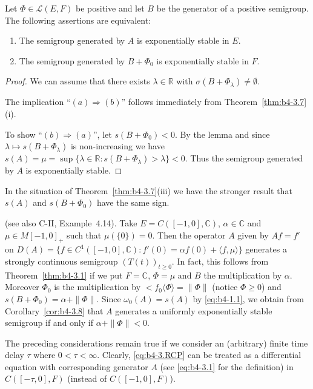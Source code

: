 \begin{corollary}\label{cor:b4-3.8}
Let $\Phi \in \mathcal{L}(E,F)$ be positive and let $B$ be the generator of a positive semigroup. 
The following assertions are equivalent:

\begin{enumerate}[\upshape (a)]
	\item 
    The semigroup generated by $A$ is exponentially stable in $E$.
	
    \item 
    The semigroup generated by $B + \Phi_{0}$ is exponentially stable in $F$.
\end{enumerate}
\end{corollary}
\begin{proof}
We can assume that there exists $\lambda \in \mathbb{R}$ with $\sigma(B+\Phi_{\lambda}) \neq \emptyset$.

The implication \enquote{$(a)\Rightarrow(b)$} follows immediately from Theorem~\ref{thm:b4-3.7}(i).

To show \enquote{$(b)\Rightarrow(a)$}, let $s(B+\Phi_{0}) < 0$. 
By the lemma and since $\lambda \mapsto s(B+\Phi_{\lambda})$ is non-increasing we have $s(A) = \mu = \sup\{\lambda \in \mathbb{R} \colon s(B+\Phi_{\lambda}) > \lambda\} < 0$. 
Thus the semigroup generated by $A$ is exponentially stable.
\end{proof}
\begin{remark*}
In the situation of Theorem~\ref{thm:b4-3.7}(iii) we have the stronger result that $s(A)$ and $s(B + \Phi_{0})$ have the same sign.
\end{remark*}
\begin{example}\label{ex:b4-3.9}
(see also C-II, Example~4.14). Take $E = C([-1,0],\mathbb{C})$, $\alpha \in \mathbb{C}$ and $\mu \in M[-1,0]_{+}$ such that $\mu(\{0\}) = 0$. 
Then the operator $A$ given by $Af = f'$ on $D(A) = \{f \in C^1([-1,0],\mathbb{C}) \colon f'(0) = \alpha f(0) + \langle f,\mu\rangle\}$ generates a strongly continuous semigroup $(T(t))_{t\geq0}$. 
In fact, this follows from Theorem~\ref{thm:b4-3.1} if we put $F = \mathbb{C}$, $\Phi = \mu$ and $B$ the multiplication by $\alpha$. 
Moreover $\Phi_{0}$ is the multiplication by $<f_{0}\langle\Phi\rangle = \|\Phi\|$ (notice $\Phi\geq0$) and $s(B + \Phi_{0}) = \alpha + \|\Phi\|$. 
Since $\omega_{0}(A) = s(A)$ by \eqref{eq:b4-1.1}, we obtain from Corollary~\ref{cor:b4-3.8} that $A$ generates a uniformly exponentially stable semigroup if and only if $\alpha + \|\Phi\| < 0$.
\end{example}
The preceding considerations remain true if we consider an (arbitrary) finite time delay $\tau$ where $0 < \tau < \infty$. 
Clearly, \eqref{eq:b4-3.RCP} can be treated as a differential equation with corresponding generator $A$ (see \eqref{eq:b4-3.1} for the definition) in $C([-\tau,0],F)$ (instead of $C([-1,0],F)$).

